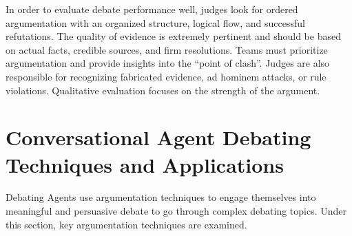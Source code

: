 \documentclass[conference]{IEEEtran}
\begin{document}
In order to evaluate debate performance well, judges look for ordered argumentation with an organized structure, logical flow, and successful refutations. The quality of evidence is extremely pertinent and should be based on actual facts, credible sources, and firm resolutions. Teams must prioritize argumentation and provide insights into the ``point of clash''. Judges are also responsible for recognizing fabricated evidence, ad hominem attacks, or rule violations. Qualitative evaluation focuses on the strength of the argument.


\section{Conversational Agent Debating Techniques and Applications}
Debating Agents use argumentation techniques to engage themselves into meaningful and persuasive debate to go through complex debating topics. Under this section, key argumentation techniques are examined.
\end{document}
